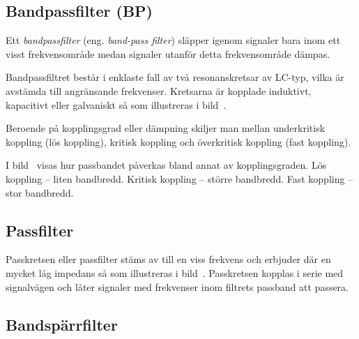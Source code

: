 \subsection{Bandpassfilter (BP)}


Ett \emph{bandpassfilter} (eng. \emph{band-pass filter}) släpper igenom signaler
bara inom ett visst frekvensområde medan signaler utanför detta frekvensområde
dämpas.

Bandpassfiltret består i enklaste fall av två resonanskretsar av LC-typ, vilka
är avstämda till angränsande frekvenser.
Kretsarna är kopplade induktivt, kapacitivt eller galvaniskt så som illustreras
i bild~.

Beroende på kopplingsgrad eller dämpning skiljer man mellan underkritisk
koppling (lös koppling), kritisk koppling och överkritisk koppling
(fast koppling).

I bild~ visas hur passbandet påverkas bland annat av
kopplingsgraden.
Lös koppling -- liten bandbredd.
Kritisk koppling -- större bandbredd.
Fast koppling -- stor bandbredd.



\subsection{Passfilter}

Passkretsen eller passfilter stäms av till en viss frekvens och erbjuder där
en mycket låg impedans så som illustreras i bild~.
Passkretsen kopplas i serie med signalvägen och låter signaler med
frekvenser inom filtrets passband att passera.


\subsection{Bandspärrfilter}

